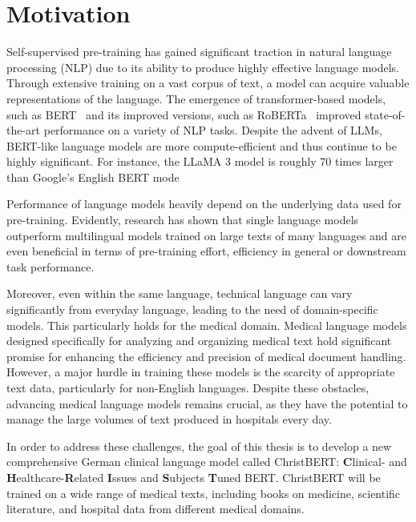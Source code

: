 \chapter*{Motivation}\label{chapter:motivation}

Self-supervised pre-training has gained significant traction in natural language
processing (NLP) due to its ability to produce highly effective language models.
Through extensive training on a vast corpus of text, a model can acquire
valuable representations of the language. The emergence of transformer-based
models, such as BERT~\cite{devlin2019bert} and its improved versions, such as
RoBERTa~\cite{liu2019roberta} improved state-of-the-art performance on a variety
of NLP tasks. Despite the advent of LLMs, BERT-like language models are more
compute-efficient and thus continue to be highly significant. For instance, the
LLaMA 3 model is roughly 70 times larger than Google's English BERT mode

Performance of language models heavily depend on the underlying data used for
pre-training. Evidently, research has shown that single language models
outperform multilingual models trained on large texts of many languages and are
even beneficial in terms of pre-training effort, efficiency in general or
downstream task performance. 

Moreover, even within the same language, technical language can vary
significantly from everyday language, leading to the need of domain-specific
models. This particularly holds for the medical domain. Medical language models
designed specifically for analyzing and organizing medical text hold significant
promise for enhancing the efficiency and precision of medical document handling.
However, a major hurdle in training these models is the scarcity of appropriate
text data, particularly for non-English languages. Despite these obstacles,
advancing medical language models remains crucial, as they have the potential to
manage the large volumes of text produced in hospitals every day.

In order to address these challenges, the goal of this thesis is to develop a
new comprehensive German clinical language model called ChristBERT:
\textbf{C}linical- and \textbf{H}ealthcare-\textbf{R}elated \textbf{I}ssues and
\textbf{S}ubjects \textbf{T}uned BERT. ChristBERT will be trained on a wide
range of medical texts, including books on medicine, scientific literature, and
hospital data from different medical domains.
